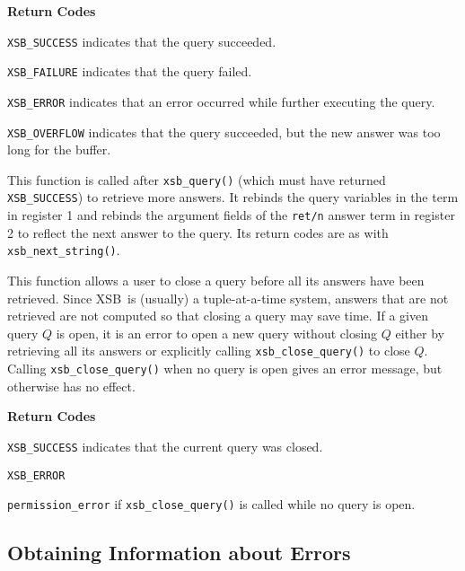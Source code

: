 \begin{description}
{\bf Return Codes}  
\bi
\item {\tt XSB\_SUCCESS} indicates that the query succeeded.
%
\item {\tt XSB\_FAILURE} indicates that the query failed.
%
\item {\tt XSB\_ERROR} indicates that an error occurred while further
  executing the query.

\item {\tt XSB\_OVERFLOW} indicates that the query succeeded, but the
  new answer was too long for the buffer.
%
\ei

  
%
This function is called after {\tt xsb\_query()} (which must have
returned {\tt XSB\_SUCCESS}) to retrieve more answers.  It rebinds the
query variables in the term in register 1 and rebinds the argument
fields of the {\tt ret/n} answer term in register 2 to reflect the
next answer to the query.  Its return codes are as with {\tt
  xsb\_next\_string()}.

 
%
This function allows a user to close a query before all its answers
have been retrieved.  Since XSB\ is (usually) a tuple-at-a-time
system, answers that are not retrieved are not computed so that
closing a query may save time.  If a given query $Q$ is open, it is an
error to open a new query without closing $Q$ either by retrieving all
its answers or explicitly calling {\tt xsb\_close\_query()} to close
$Q$.  Calling {\tt xsb\_close\_query()} when no query is open gives an
error message, but otherwise has no effect.

{\bf Return Codes}  
\bi
\item {\tt XSB\_SUCCESS} indicates that the current query was closed.
%
\item {\tt XSB\_ERROR} 
\bi
\item {\tt permission\_error} if {\tt xsb\_close\_query()} is
  called while no query is open.
\ei
\ei

\end{description}

\subsection{Obtaining Information about Errors}

